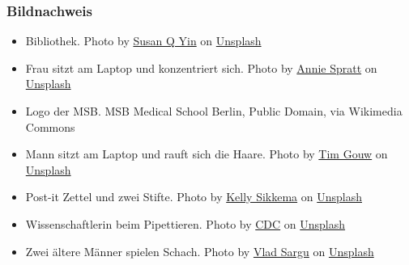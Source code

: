 \documentclass{beamer}
\begin{document}
\begin{frame}
\frametitle{Bildnachweis}


\begin{tiny}
 
\begin{itemize}

\item 
Bibliothek. Photo by \href{https://unsplash.com/@syinq?utm_content=creditCopyText&utm_medium=referral&utm_source=unsplash}{Susan Q Yin} on \href{https://unsplash.com/photos/books-on-brown-wooden-shelf-2JIvboGLeho?utm_content=creditCopyText&utm_medium=referral&utm_source=unsplash}{Unsplash}
  

\item 
Frau sitzt am Laptop und konzentriert sich. Photo by \href{https://unsplash.com/@anniespratt?utm_content=creditCopyText&utm_medium=referral&utm_source=unsplash}{Annie Spratt} on \href{https://unsplash.com/photos/woman-in-black-long-sleeve-shirt-using-macbook-air-on-brown-wooden-table-CV3nkG7XIwg?utm_content=creditCopyText&utm_medium=referral&utm_source=unsplash}{Unsplash}
  

  
\item
Logo der MSB. MSB Medical School Berlin, Public Domain, via Wikimedia Commons

\item 
Mann sitzt am Laptop und rauft sich die Haare. Photo by \href{https://unsplash.com/@punttim?utm_content=creditCopyText&utm_medium=referral&utm_source=unsplash}{Tim Gouw} on \href{https://unsplash.com/photos/man-wearing-white-top-using-macbook-1K9T5YiZ2WU?utm_content=creditCopyText&utm_medium=referral&utm_source=unsplash}{Unsplash}

\item 
Post-it Zettel und zwei Stifte. Photo by \href{https://unsplash.com/@kellysikkema?utm_content=creditCopyText&utm_medium=referral&utm_source=unsplash}{Kelly Sikkema} on \href{https://unsplash.com/photos/red-marker-and-orange-pen-on-white-surface-QtSDRxvZHQc?utm_content=creditCopyText&utm_medium=referral&utm_source=unsplash}{Unsplash}
  

\item 
Wissenschaftlerin beim Pipettieren.  Photo by \href{https://unsplash.com/@cdc?utm_content=creditCopyText&utm_medium=referral&utm_source=unsplash}{CDC} on \href{https://unsplash.com/photos/woman-holding-brown-glass-_N7I1JyPYJw?utm_content=creditCopyText&utm_medium=referral&utm_source=unsplash}{Unsplash}

\item 
Zwei ältere Männer spielen Schach. Photo by \href{https://unsplash.com/@vladsargu?utm_content=creditCopyText&utm_medium=referral&utm_source=unsplash}{Vlad Sargu} on \href{https://unsplash.com/photos/two-men-playing-chess-ItphH2lGzuI?utm_content=creditCopyText&utm_medium=referral&utm_source=unsplash}{Unsplash}
   
\end{itemize}

\end{tiny}
\end{frame}
\end{document}
